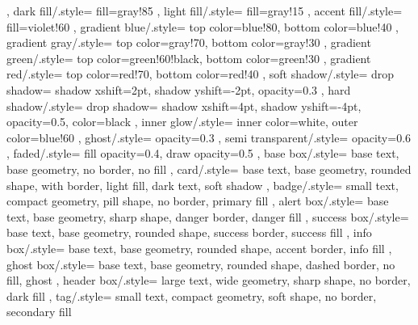 {{	},
	dark fill/.style={
		fill=gray!85
	},
	light fill/.style={
		fill=gray!15
	},
	accent fill/.style={
		fill=violet!60
	},
	gradient blue/.style={
		top color=blue!80,
		bottom color=blue!40
	},
	gradient gray/.style={
		top color=gray!70,
		bottom color=gray!30
	},
	gradient green/.style={
		top color=green!60!black,
		bottom color=green!30
	},
	gradient red/.style={
		top color=red!70,
		bottom color=red!40
	},
	soft shadow/.style={
		drop shadow={
			shadow xshift=2pt,
			shadow yshift=-2pt,
			opacity=0.3
		}
	},
	hard shadow/.style={
		drop shadow={
			shadow xshift=4pt,
			shadow yshift=-4pt,
			opacity=0.5,
			color=black
		}
	},
	inner glow/.style={
		inner color=white,
		outer color=blue!60
	},
	ghost/.style={
		opacity=0.3
	},
	semi transparent/.style={
		opacity=0.6
	},
	faded/.style={
		fill opacity=0.4,
		draw opacity=0.5
	},
	base box/.style={
		base text,
		base geometry,
		no border,
		no fill
	},
	card/.style={
		base text,
		base geometry,
		rounded shape,
		with border,
		light fill,
		dark text,
		soft shadow
	},
	badge/.style={
		small text,
		compact geometry,
		pill shape,
		no border,
		primary fill
	},
	alert box/.style={
		base text,
		base geometry,
		sharp shape,
		danger border,
		danger fill
	},
	success box/.style={
		base text,
		base geometry,
		rounded shape,
		success border,
		success fill
	},
	info box/.style={
		base text,
		base geometry,
		rounded shape,
		accent border,
		info fill
	},
	ghost box/.style={
		base text,
		base geometry,
		rounded shape,
		dashed border,
		no fill,
		ghost
	},
	header box/.style={
		large text,
		wide geometry,
		sharp shape,
		no border,
		dark fill
	},
	tag/.style={
		small text,
		compact geometry,
		soft shape,
		no border,
		secondary fill
	}
}